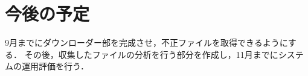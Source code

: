 \documentclass{entry}
\begin{document}



\section{今後の予定}

9月までにダウンローダー部を完成させ，不正ファイルを取得できるようにする．
その後，収集したファイルの分析を行う部分を作成し，11月までにシステムの運用評価を行う．



%

\end{document}
